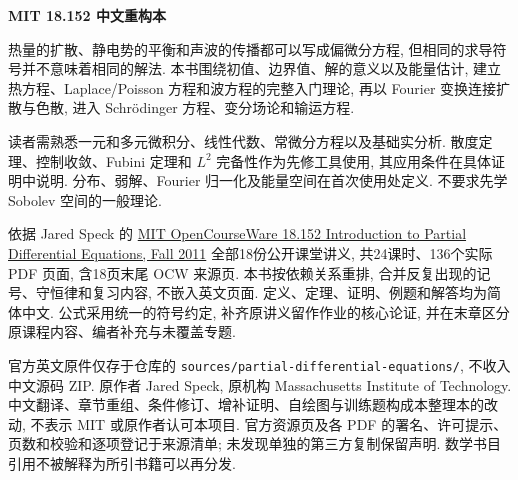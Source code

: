 \frontmatter
\begin{center}
{\color{structurecolor}\bfseries\fontsize{18}{25}\selectfont\BookTitle\par}
{\bfseries MIT 18.152 中文重构本\par}
\BookAuthor\par
\BookDate\par
\end{center}
\originalpreface
热量的扩散、静电势的平衡和声波的传播都可以写成偏微分方程, 但相同的求导符号并不意味着相同的解法. 本书围绕初值、边界值、解的意义以及能量估计, 建立热方程、Laplace/Poisson 方程和波方程的完整入门理论, 再以 Fourier 变换连接扩散与色散, 进入 Schrödinger 方程、变分场论和输运方程.

读者需熟悉一元和多元微积分、线性代数、常微分方程以及基础实分析. 散度定理、控制收敛、Fubini 定理和 $L^2$ 完备性作为先修工具使用, 其应用条件在具体证明中说明. 分布、弱解、Fourier 归一化及能量空间在首次使用处定义. 不要求先学 Sobolev 空间的一般理论.

依据 Jared Speck 的 \href{https://ocw.mit.edu/courses/18-152-introduction-to-partial-differential-equations-fall-2011/pages/lecture-notes/}{MIT OpenCourseWare 18.152 Introduction to Partial Differential Equations, Fall 2011} 全部18份公开课堂讲义, 共24课时、136个实际 PDF 页面, 含18页末尾 OCW 来源页. 本书按依赖关系重排, 合并反复出现的记号、守恒律和复习内容, 不嵌入英文页面. 定义、定理、证明、例题和解答均为简体中文. 公式采用统一的符号约定, 补齐原讲义留作作业的核心论证, 并在末章区分原课程内容、编者补充与未覆盖专题.

官方英文原件仅存于仓库的 \texttt{sources/partial-differential-equations/}, 不收入中文源码 ZIP. 原作者 Jared Speck, 原机构 Massachusetts Institute of Technology. 中文翻译、章节重组、条件修订、增补证明、自绘图与训练题构成本整理本的改动, 不表示 MIT 或原作者认可本项目. 官方资源页及各 PDF 的署名、许可提示、页数和校验和逐项登记于来源清单; 未发现单独的第三方复制保留声明. 数学书目引用不被解释为所引书籍可以再分发.

